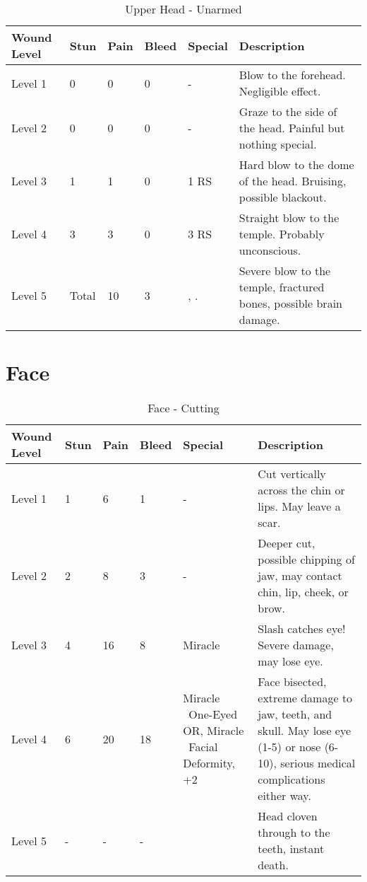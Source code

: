 \documentclass[oneside,11pt,english]{book}
\begin{document}
\begin{table}[!hb] %
	\caption{Upper Head - Unarmed}
	\label{wound: Upper Head - Unarmed}
	\begin{tabu} to 
Wound Level &Stun &Pain &Bleed &Special &Description\\\toprule
Level 1& 0& 0& 0& - &Blow to the forehead. Negligible effect.\\
Level 2& 0& 0& 0& - &Graze to the side of the head. Painful but nothing special.\\
Level 3& 1& 1& 0&  1 RS &Hard blow to the dome of the head. Bruising, possible blackout.\\
Level 4& 3& 3& 0&  3 RS &Straight blow to the temple. Probably unconscious. \\
Level 5& Total& 10 &3 
	&, \newline
	.
&Severe blow to the temple, fractured bones, possible brain damage.\\
	\end{tabu}
\end{table}
	\clearpage

\section{Face} \vspace{-25pt} \label{sec:face}
\begin{table}[hb] %
	\caption{Face - Cutting}
	\label{wound:Face - Cutting}
	\begin{tabu} to 
Wound Level &Stun &Pain &Bleed &Special &Description\\\toprule
Level 1& 1& 6& 1& - &Cut vertically across the chin or lips. May leave a scar.\\
Level 2& 2& 8& 3& - &Deeper cut, possible chipping of jaw, may contact chin, lip, cheek, or brow.\\
Level 3& 4& 16& 8&Miracle ~ &Slash catches eye! Severe damage, may lose eye.\\
Level 4& 6& 20& 18
	&Miracle ~One-Eyed OR,\newline
	Miracle ~Facial Deformity,\newline
	 +2
&Face bisected, extreme damage to jaw, teeth, and skull. May lose eye (1-5) or nose (6-10), serious medical complications either way.\\
Level 5& - &- &- && Head cloven through to the teeth, instant death.\\
	\end{tabu}
\end{table}
\end{document}
